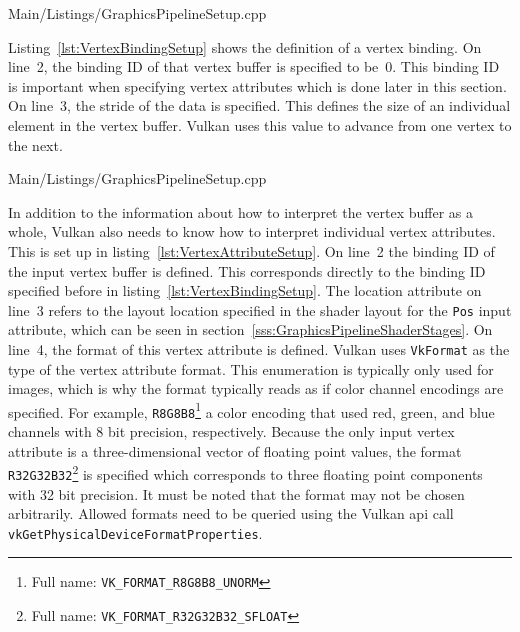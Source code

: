         
        {Main/Listings/GraphicsPipelineSetup.cpp}

        Listing~\ref{lst:VertexBindingSetup} shows the definition of a vertex binding.
        On line~2, the binding ID of that vertex buffer is specified to be~0.
        This binding ID is important when specifying vertex attributes which is done later in this section.
        On line~3, the stride of the data is specified.
        This defines the size of an individual element in the vertex buffer.
        Vulkan uses this value to advance from one vertex to the next.

        
        {Main/Listings/GraphicsPipelineSetup.cpp}

        In addition to the information about how to interpret the vertex buffer as a whole, Vulkan also needs to know how to interpret individual vertex attributes.
        This is set up in listing~\ref{lst:VertexAttributeSetup}.
        On line~2 the binding ID of the input vertex buffer is defined.
        This corresponds directly to the binding ID specified before in listing~\ref{lst:VertexBindingSetup}.
        The location attribute on line~3 refers to the layout location specified in the shader layout for the \lstinline{Pos} input attribute, which can be seen in section~\ref{sss:GraphicsPipelineShaderStages}.
        On line~4, the format of this vertex attribute is defined.
        Vulkan uses \lstinline{VkFormat} as the type of the vertex attribute format.
        This enumeration is typically only used for images, which is why the format typically reads as if color channel encodings are specified.
        For example, \lstinline{R8G8B8}\footnote{Full name: \lstinline{VK_FORMAT_R8G8B8_UNORM}} a color encoding that used red, green, and blue channels with 8 bit precision, respectively.
        Because the only input vertex attribute is a three-dimensional vector of floating point values, the format \lstinline{R32G32B32}\footnote{Full name: \lstinline{VK_FORMAT_R32G32B32_SFLOAT}} is specified which corresponds to three floating point components with 32 bit precision.
        It must be noted that the format may not be chosen arbitrarily.
        Allowed formats need to be queried using the Vulkan \gls{api} call \lstinline{vkGetPhysicalDeviceFormatProperties}.

